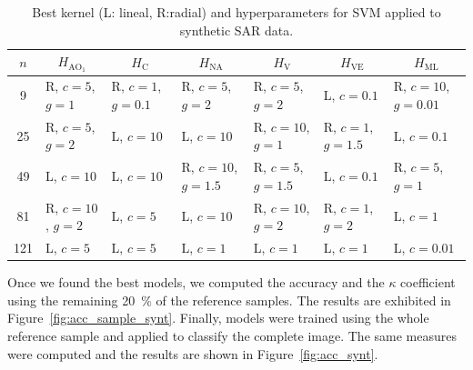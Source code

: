 \documentclass[journal]{IEEEtran}
\begin{document}

\begin{table}[htbp]
  \centering
  \caption{Best kernel (L: lineal, R:radial) and hyperparameters for SVM applied to synthetic SAR data.}
  \label{tab:hyperparameters}
   \begin{tabular}{cllllll}
    \toprule
    $n$ & \multicolumn{1}{c}{$H_{\text{AO}_1}$} & \multicolumn{1}{c}{$H_\text{C}$} & \multicolumn{1}{c}{$H_{\text{NA}}$} & \multicolumn{1}{c}{$H_\text{V}$} & \multicolumn{1}{c}{$H_{\text{VE}}$} & \multicolumn{1}{c}{$H_{\text{ML}}$} \\
    \midrule
      9     & R, $c=5$, $g=1$ & R, $c=1$, $g=0.1$ & R, $c=5$, $g=2$ & R, $c=5$, $g=2$ & L, $c=0.1$ & R, $c=10$, $g=0.01$ \\
           25    & R, $c=5$, $g=2$ & L, $c=10$ & L, $c=10$ & R, $c=10$, $g=1$ & R, $c=1$, $g=1.5$ & L, $c=0.1$ \\
           49    & L, $c=10$ & L, $c=10$ & R, $c=10$, $g=1.5$ & R, $c=5$, $g=1.5$ & L, $c=0.1$ & R, $c=5$, $g=1$ \\
           81    & R, $c=10$, $g=2$ & L, $c=5$ & L, $c=10$ & R, $c=10$, $g=2$ & R, $c=1$, $g=2$ & L, $c=1$ \\
           121   & L, $c=5$ & L, $c=5$ & L, $c=1$ & L, $c=1$ & L, $c=1$ & L, $c=0.01$ \\
    \bottomrule
    \end{tabular}
\end{table}

Once we found the best models, we computed the accuracy and the $\kappa$ coefficient using the remaining \SI{20}{\percent} of the reference samples. The results are exhibited in Figure~\ref{fig:acc_sample_synt}.
Finally, models were trained using the whole reference sample and applied to classify the complete image. 
The same measures were computed and the results are shown in Figure~\ref{fig:acc_synt}.
\end{document}
